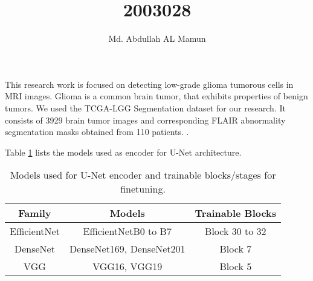 \documentclass{article}
\title{2003028}
\author{Md. Abdullah AL Mamun}
\begin{document}
\maketitle

This research work is focused on detecting low-grade glioma tumorous cells in MRI images. Glioma is a common brain tumor, that exhibits properties of benign tumors. We used the TCGA-LGG Segmentation dataset for our research. It consists of 3929 brain tumor images and corresponding FLAIR abnormality segmentation masks obtained from 110 patients. .

Table \ref{tab:encoder-models} lists the models used as encoder for U-Net architecture.

\begin{table}[htbp]
    \centering
    \caption{Models used for U-Net encoder and trainable blocks/stages for finetuning.}
    \label{tab:encoder-models}
    \begin{tabular}{c c c}
        \hline
        Family       & Models                   & Trainable Blocks \\
        \hline
        EfficientNet & EfficientNetB0 to B7     & Block 30 to 32   \\
        DenseNet     & DenseNet169, DenseNet201 & Block 7          \\
        VGG          & VGG16, VGG19             & Block 5          \\
        \hline
    \end{tabular}
\end{table}


\end{document}
